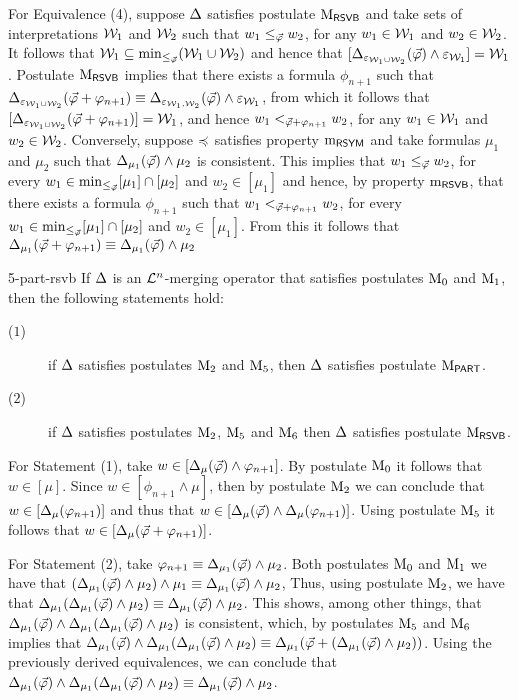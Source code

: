 \begin{prf*}{}{}
	For Equivalence (4), suppose $\me$ satisfies postulate $\ppm{\RSVB}$
	and take sets of interpretations $\W_1$ and $\W_2$
	such that $w_1 \le_{\P}w_2$, for any $w_1\in\W_1$ and $w_2\in\W_2$.
	It follows that $\W_1\subseteq\min_{\le_{\P}}(\W_1\cup\W_2)$
	and hence that $[\me_{\px_{\W_1\cup\W_2}}(\P)\land \px_{\W_1}]=\W_1$.
	Postulate $\ppm{\RSVB}$ implies that there exists a formula 
	$\phi_{n+1}$ such that $\me_{\px_{\W_1\cup\W_2}}(\P+\phi_{n+1})\equiv\me_{\px_{\W_1,\W_2}}(\P)\land\px_{\W_1}$,
	from which it follows that $[\me_{\px_{\W_1\cup\W_2}}(\P+\phi_{n+1})]=\W_1$,
	and hence $w_1<_{\P+\phi_{n+1}}w_2$,
	for any $w_1\in\W_1$ and $w_2\in\W_2$.
	Conversely, suppose $\as$ satisfies property $\oom{\RSYM}$
	and take formulas $\mu_1$ and $\mu_2$ such that $\me_{\mu_1}(\P)\land\mu_2$
	is consistent.
	This implies that $w_1 \le_{\P}w_2$, for every $w_1\in\min_{\le_{\P}}[\mu_1]\cap[\mu_2]$
	and $w_2\in[\mu_1]$ and hence, by property $\oom{\RSVB}$,
	that there exists a formula $\phi_{n+1}$ such that 
	$w_1 <_{\P+\phi_{n+1}}w_2$, for every $w_1\in\min_{\le_{\P}}[\mu_1]\cap[\mu_2]$
	and $w_2\in[\mu_1]$.
	From this it follows that $\me_{\mu_1}(\P+\phi_{n+1})\equiv \me_{\mu_1}(\P)\land \mu_2$
\end{prf*}

\begin{prp}{}{5-part-rsvb}
	If $\me$ is an $\L^{n}$-merging operator that satisfies postulates $\ppm{0}$ and $\ppm{1}$,
	then the following statements hold:
	\begin{description}
		\item[($1$)] if $\me$ satisfies postulates $\ppm{2}$ and $\ppm{5}$, 
			then $\me$ satisfies postulate $\ppm{\PART}$.
		\item[($2$)] if $\me$ satisfies postulates $\ppm{2}$, $\ppm{5}$ and $\ppm{6}$ 
			then $\me$ satisfies postulate $\ppm{\RSVB}$.
	\end{description}
\end{prp}
\begin{prf*}{}{}%
	For Statement (1), take $w\in[\me_{\mu}(\P)\land\phi_{n+1}]$.
	By postulate $\ppm{0}$ it follows that $w\in[\mu]$.
	Since $w\in[\phi_{n+1}\land\mu]$, then by postulate $\ppm{2}$ 
	we can conclude that $w\in[\me_{\mu}(\phi_{n+1})]$
	and thus that $w\in[\me_{\mu}(\P)\land\me_{\mu}(\phi_{n+1})]$.
	Using postulate $\ppm{5}$ it follows that $w\in[\me_{\mu}(\P+\phi_{n+1})]$.

	For Statement (2), take $\phi_{n+1}\equiv \me_{\mu_1}(\P)\land\mu_2$.
	Both postulates $\ppm{0}$ and $\ppm{1}$ we have that 
	$(\me_{\mu_1}(\P)\land\mu_2)\land\mu_1\equiv\me_{\mu_1}(\P)\land\mu_2$,
	Thus, using postulate $\ppm{2}$, we have that 
	$\me_{\mu_1}(\me_{\mu_1}(\P)\land\mu_2)\equiv \me_{\mu_1}(\P)\land\mu_2$.
	This shows, among other things, that
	$\me_{\mu_1}(\P)\land \me_{\mu_1}(\me_{\mu_1}(\P)\land\mu_2)$ is consistent,
	which,
	by postulates $\ppm{5}$ and $\ppm{6}$ implies that
	$\me_{\mu_1}(\P)\land \me_{\mu_1}(\me_{\mu_1}(\P)\land\mu_2)\equiv \me_{\mu_1}(\P+(\me_{\mu_1}(\P)\land\mu_2))$.
	Using the previously derived equivalences,
	we can conclude that 
	$\me_{\mu_1}(\P)\land \me_{\mu_1}(\me_{\mu_1}(\P)\land\mu_2)\equiv \me_{\mu_1}(\P)\land\mu_2$.
\end{prf*}

